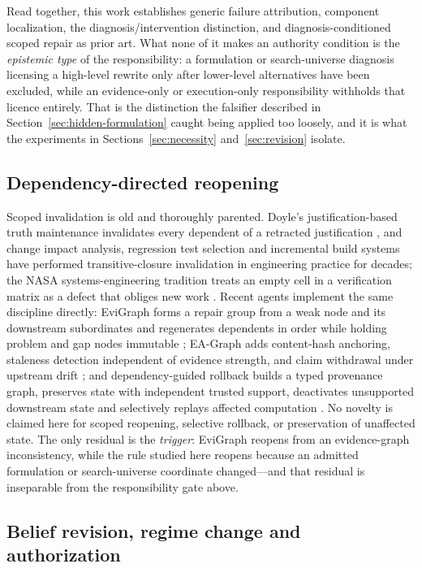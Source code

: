 Read together, this work establishes generic failure attribution, component
localization, the diagnosis/intervention distinction, and diagnosis-conditioned
scoped repair as prior art. What none of it makes an authority condition is the
\emph{epistemic type} of the responsibility: a formulation or search-universe
diagnosis licensing a high-level rewrite only after lower-level alternatives
have been excluded, while an evidence-only or execution-only responsibility
withholds that licence entirely. That is the distinction the falsifier described
in Section~\ref{sec:hidden-formulation} caught being applied too loosely, and it
is what the experiments in Sections~\ref{sec:necessity} and~\ref{sec:revision}
isolate.

\subsection{Dependency-directed reopening}

Scoped invalidation is old and thoroughly parented. Doyle's justification-based
truth maintenance invalidates every dependent of a retracted justification
\cite{doyle1979}, and change impact analysis, regression test selection and
incremental build systems have performed transitive-closure invalidation in
engineering practice for decades; the NASA systems-engineering tradition treats
an empty cell in a verification matrix as a defect that obliges new work
\cite{nasa2016}. Recent agents implement the same discipline directly: EviGraph
forms a repair group from a weak node and its downstream subordinates and
regenerates dependents in order while holding problem and gap nodes immutable
\cite{evigraph2026}; EA-Graph adds content-hash anchoring, staleness detection
independent of evidence strength, and claim withdrawal under upstream drift
\cite{eagraph2026}; and dependency-guided rollback builds a typed provenance
graph, preserves state with independent trusted support, deactivates unsupported
downstream state and selectively replays affected computation
\cite{dependencyrollback2026}. No novelty is claimed here for scoped reopening,
selective rollback, or preservation of unaffected state. The only residual is
the \emph{trigger}: EviGraph reopens from an evidence-graph inconsistency, while
the rule studied here reopens because an admitted formulation or search-universe
coordinate changed---and that residual is inseparable from the responsibility
gate above.

\subsection{Belief revision, regime change and authorization}

